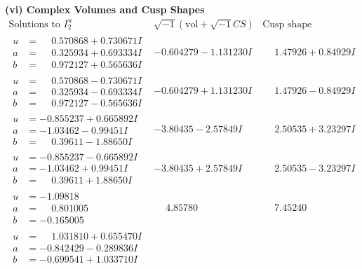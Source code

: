 \documentclass[1p]{elsarticle_modified}
\theoremstyle{definition}
\newcommand{\I}{\sqrt{-1}}
\begin{document}
\newpage\flushleft \textbf{(vi) Complex Volumes and Cusp Shapes}
$$\begin{array}{c|c|c}  
\text{Solutions to }I^u_{2}& \I (\text{vol} + \sqrt{-1}CS) & \text{Cusp shape}\\
 \hline 
\begin{aligned}
u &= \phantom{-}0.570868 + 0.730671 I \\
a &= \phantom{-}0.325934 + 0.693334 I \\
b &= \phantom{-}0.972127 + 0.565636 I\end{aligned}
 & -0.604279 - 1.131230 I & \phantom{-}1.47926 + 0.84929 I \\ \hline\begin{aligned}
u &= \phantom{-}0.570868 - 0.730671 I \\
a &= \phantom{-}0.325934 - 0.693334 I \\
b &= \phantom{-}0.972127 - 0.565636 I\end{aligned}
 & -0.604279 + 1.131230 I & \phantom{-}1.47926 - 0.84929 I \\ \hline\begin{aligned}
u &= -0.855237 + 0.665892 I \\
a &= -1.03462 - 0.99451 I \\
b &= \phantom{-}0.39611 - 1.88650 I\end{aligned}
 & -3.80435 - 2.57849 I & \phantom{-}2.50535 + 3.23297 I \\ \hline\begin{aligned}
u &= -0.855237 - 0.665892 I \\
a &= -1.03462 + 0.99451 I \\
b &= \phantom{-}0.39611 + 1.88650 I\end{aligned}
 & -3.80435 + 2.57849 I & \phantom{-}2.50535 - 3.23297 I \\ \hline\begin{aligned}
u &= -1.09818\phantom{ +0.000000I} \\
a &= \phantom{-}0.801005\phantom{ +0.000000I} \\
b &= -0.165005\phantom{ +0.000000I}\end{aligned}
 & \phantom{-}4.85780\phantom{ +0.000000I} & \phantom{-}7.45240\phantom{ +0.000000I} \\ \hline\begin{aligned}
u &= \phantom{-}1.031810 + 0.655470 I \\
a &= -0.842429 - 0.289836 I \\
b &= -0.699541 + 1.033710 I\end{aligned}

\end{array}$$
\end{document}
